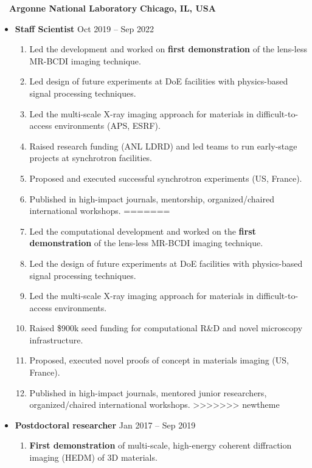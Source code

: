 ~~{\color{black}\textbf{Argonne National Laboratory} \hfill  \textbf{Chicago, IL, USA}}\par
\begin{itemize}
    \item
        \textbf{Staff Scientist}
        \hfill  {Oct 2019 -- Sep 2022} \par
        \begin{enumerate}
<<<<<<< HEAD
            \item Led the development and worked on \textbf{first demonstration} of the lens-less MR-BCDI imaging technique.
            \item Led design of future experiments at DoE facilities with physics-based signal processing techniques.
            \item Led the multi-scale X-ray imaging approach for materials in difficult-to-access environments (APS, ESRF).
            \item Raised research funding (ANL LDRD) and led teams to run early-stage projects at synchrotron facilities.
            \item Proposed and executed successful synchrotron experiments (US, France).
            \item Published in high-impact journals, mentorship, organized/chaired international workshops.
=======
            \item Led the computational development and worked on the \textbf{first demonstration} of the lens-less MR-BCDI imaging technique.
            \item Led the design of future experiments at DoE facilities with physics-based signal processing techniques.
            \item Led the multi-scale X-ray imaging approach for materials in difficult-to-access environments.
            \item Raised \$900k seed funding for computational R\&D and novel microscopy infrastructure. 
            \item Proposed, executed novel proofs of concept in materials imaging (US, France).
            \item Published in high-impact journals, mentored junior researchers, organized/chaired international workshops.
>>>>>>> newtheme
        \end{enumerate}
    \item
        \textbf{Postdoctoral researcher}
        \hfill  {Jan 2017 -- Sep 2019} \par
        \begin{enumerate}
            \item \textbf{First demonstration} of multi-scale, high-energy coherent diffraction imaging (HEDM) of 3D materials.
        \end{enumerate}
\end{itemize}